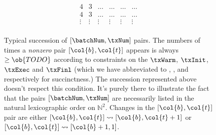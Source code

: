 \begin{figure}
\[\begin{array}{|c|c||c|c|c|c|}
	4 & 3 & \dots & \dots & \dots & \dots \\
	4 & 3 & \dots & \dots & \dots & \dots \\
	\vdots & \vdots & \vdots & \vdots & \vdots & \vdots \\
\end{array}
\]
\caption{Typical succession of $[ \batchNum, \txNum ]$ pairs. The numbers of times a \emph{nonzero} pair $[\col{b}, \col{t}]$ appears is always $\geq \ob{TODO}$ according to constraints on the
$\txWarm$,
$\txInit$,
$\txExec$ and
$\txFinl$ (which we have abbreviated to
,
,
 and
 respectively for succinctness.) The succession represented above doesn't respect this condition. It's purely there to illustrate the fact that the pairs $[ \batchNum, \txNum ]$ are necessarily listed in the natural lexicographic order on $\mathbb{N}^2$. Changes in the $[ \col{b}, \col{t} ]$ pair are either
$[ \col{b}, \col{t} ]\rightsquigarrow [ \col{b}, \col{t} + 1]$ or
$[ \col{b}, \col{t} ]\rightsquigarrow [ \col{b} + 1, 1]$. }
\end{figure}